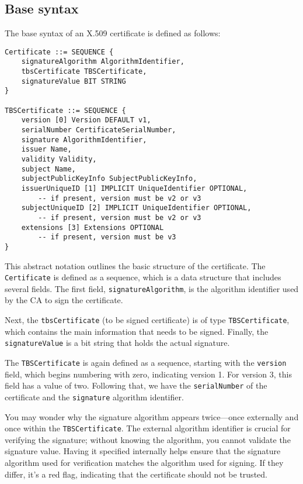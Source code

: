 \subsection{Base syntax}

The base syntax of an X.509 certificate is defined as follows:

\begin{verbatim}
Certificate ::= SEQUENCE {
    signatureAlgorithm AlgorithmIdentifier,
    tbsCertificate TBSCertificate,
    signatureValue BIT STRING
}

TBSCertificate ::= SEQUENCE {
    version [0] Version DEFAULT v1,
    serialNumber CertificateSerialNumber,
    signature AlgorithmIdentifier,
    issuer Name,
    validity Validity,
    subject Name,
    subjectPublicKeyInfo SubjectPublicKeyInfo,
    issuerUniqueID [1] IMPLICIT UniqueIdentifier OPTIONAL,
        -- if present, version must be v2 or v3
    subjectUniqueID [2] IMPLICIT UniqueIdentifier OPTIONAL,
        -- if present, version must be v2 or v3
    extensions [3] Extensions OPTIONAL
        -- if present, version must be v3
}
\end{verbatim}

This abstract notation outlines the basic structure of the
certificate. The \texttt{Certificate} is defined as a sequence, which
is a data structure that includes several fields. The first field,
\texttt{signatureAlgorithm}, is the algorithm identifier used by the
CA to sign the certificate. 

Next, the \texttt{tbsCertificate} (to be signed certificate) is of
type \texttt{TBSCertificate}, which contains the main information that
needs to be signed. Finally, the \texttt{signatureValue} is a bit
string that holds the actual signature.

The \texttt{TBSCertificate} is again defined as a sequence, starting
with the \texttt{version} field, which begins numbering with zero,
indicating version 1. For version 3, this field has a value of two.
Following that, we have the \texttt{serialNumber} of the certificate
and the \texttt{signature} algorithm identifier. 

You may wonder why the signature algorithm appears twice—once
externally and once within the \texttt{TBSCertificate}. The external
algorithm identifier is crucial for verifying the signature; without
knowing the algorithm, you cannot validate the signature value. Having
it specified internally helps ensure that the signature algorithm used
for verification matches the algorithm used for signing. If they
differ, it's a red flag, indicating that the certificate should not be
trusted.

